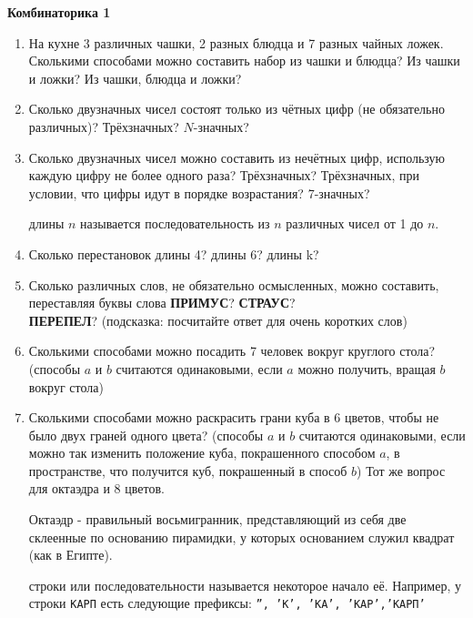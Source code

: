\centerline{\bf Комбинаторика 1}
\flushleft
\begin{enumerate}
\item На кухне 3 различных чашки, 2 разных блюдца и 7 разных чайных ложек. Сколькими способами можно
составить набор из чашки и блюдца? Из чашки и ложки? Из чашки, блюдца и ложки?
\item Сколько двузначных чисел состоят только из чётных цифр (не обязательно различных)?
Трёхзначных? $N$-значных?
\item Сколько двузначных чисел можно составить из нечётных цифр, использую каждую цифру не более
одного раза? Трёхзначных? Трёхзначных, при условии, что цифры идут в порядке возрастания? 7-значных?

 длины $n$ называется последовательность из $n$
различных чисел от 1 до $n$.
\item Сколько перестановок длины 4? длины 6? длины k?
\item Сколько различных слов, не обязательно осмысленных, можно составить, переставляя буквы слова
    {\bf ПРИМУС}? {\bf СТРАУС}? \\{\bf ПЕРЕПЕЛ}? {\small (подсказка: посчитайте ответ для очень
        коротких слов)}
\item Сколькими способами можно посадить 7 человек вокруг круглого стола? (способы $a$ и $b$ считаются
    одинаковыми, если $a$ можно получить, вращая $b$ вокруг стола)
\item Сколькими способами можно раскрасить грани куба в 6 цветов, чтобы не было двух граней одного
    цвета? (способы $a$ и $b$ считаются одинаковыми, если можно так изменить положение куба, покрашенного
        способом $a$, в пространстве, что получится куб, покрашенный в способ $b$) Тот же вопрос для
        октаэдра и 8 цветов.

        Октаэдр - правильный восьмигранник, представляющий из себя
        две склеенные по основанию пирамидки, у которых основанием служил квадрат (как в Египте).

 строки или последовательности называется некоторое начало
        её. Например, у строки {\tt КАРП} есть следующие префиксы: {\tt '', 'К', 'КА', 'КАР','КАРП'}
\end{enumerate}
